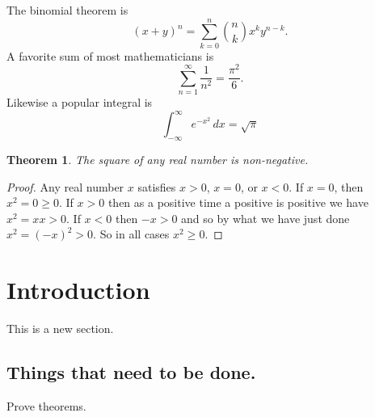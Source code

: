 \documentclass{amsart}
\newtheorem{thm}{Theorem}[section]
\theoremstyle{definition}
\theoremstyle{remark}
\numberwithin{equation}{section}
\begin{document}

The binomial theorem is
$$
	(x+y)^n=\sum_{k=0}^n\binom{n}{k}x^ky^{n-k}.
$$
A favorite sum of most mathematicians is
$$
	\sum_{n=1}^\infty \frac{1}{n^2}=\frac{\pi^2}{6}.
$$
Likewise a popular integral is
$$
	\int_{-\infty}^\infty e^{-x^2}\,dx=\sqrt{\pi}
$$



\begin{thm} The square of any real number is non-negative.
\end{thm}


\begin{proof}
	Any real number $x$ satisfies $x>0$, $x=0$, or $x<0$.
	If $x=0$, then $x^2=0\ge 0$.  If $x>0$ then as a positive time a
	positive is positive we have $x^2=xx>0$.  If $x<0$ then $-x>0$ and so
	by what we have just done $x^2=(-x)^2>0$.  So in all cases $x^2\ge0$.
\end{proof}




\section{Introduction}

This is a new section.


\subsection{Things that need to be done.}
Prove theorems.
\end{document}
